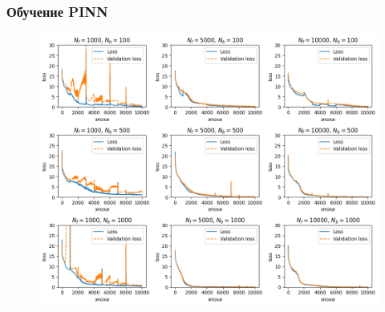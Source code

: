 \documentclass[t]{beamer}
\begin{document}
    \begin{frame}
        \frametitle{Обучение PINN}
        \begin{figure}[htb!]
            \includegraphics[height=0.7\textwidth]{../plots/termal/loss alt l = (20x4) Nf=[1000, 5000, 10000] Nu=[100, 500, 1000].png}
        \end{figure}
    \end{frame}
\end{document}

